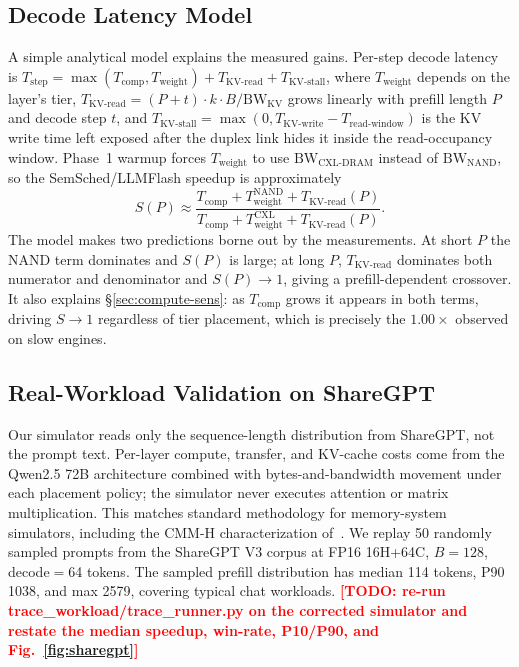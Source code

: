 \documentclass[10pt,conference,letterpaper]{IEEEtran}
\newcommand{\todo}[1]{\textcolor{red}{\textbf{[TODO: #1]}}}
\begin{document}
\subsection{Decode Latency Model}
\label{sec:model}
\noindent
A simple analytical model explains the measured gains. Per-step decode latency is
$T_{\text{step}} = \max(T_{\text{comp}}, T_{\text{weight}}) + T_{\text{KV-read}} + T_{\text{KV-stall}}$,
where $T_{\text{weight}}$ depends on the layer's tier, $T_{\text{KV-read}}=(P+t) \cdot k \cdot B/\text{BW}_{\text{KV}}$ grows linearly with prefill length $P$ and decode step $t$, and $T_{\text{KV-stall}}=\max(0, T_{\text{KV-write}}-T_{\text{read-window}})$ is the KV write time left exposed after the duplex link hides it inside the read-occupancy window. Phase~1 warmup forces $T_{\text{weight}}$ to use $\text{BW}_{\text{CXL-DRAM}}$ instead of $\text{BW}_{\text{NAND}}$, so the SemSched/LLMFlash speedup is approximately
\[ S(P) \approx \frac{T_{\text{comp}}+T_{\text{weight}}^{\text{NAND}}+T_{\text{KV-read}}(P)}{T_{\text{comp}}+T_{\text{weight}}^{\text{CXL}}+T_{\text{KV-read}}(P)}. \]
The model makes two predictions borne out by the measurements. At short $P$ the NAND term dominates and $S(P)$ is large; at long $P$, $T_{\text{KV-read}}$ dominates both numerator and denominator and $S(P)\to 1$, giving a prefill-dependent crossover. It also explains \S\ref{sec:compute-sens}: as $T_{\text{comp}}$ grows it appears in both terms, driving $S \to 1$ regardless of tier placement, which is precisely the $1.00\times$ observed on slow engines.

\subsection{Real-Workload Validation on ShareGPT}
\label{sec:sharegpt}
\noindent
Our simulator reads only the sequence-length distribution from ShareGPT, not the prompt text. Per-layer compute, transfer, and KV-cache costs come from the Qwen2.5 72B architecture combined with bytes-and-bandwidth movement under each placement policy; the simulator never executes attention or matrix multiplication. This matches standard methodology for memory-system simulators, including the CMM-H characterization of~\cite{soltaniyeh2025revisiting}. We replay 50 randomly sampled prompts from the ShareGPT V3 corpus at FP16 16H+64C, $B{=}128$, decode$=$64 tokens. The sampled prefill distribution has median 114 tokens, P90 1038, and max 2579, covering typical chat workloads.
\todo{re-run trace\_workload/trace\_runner.py on the corrected simulator and restate the median speedup, win-rate, P10/P90, and Fig.~\ref{fig:sharegpt}}
\end{document}
